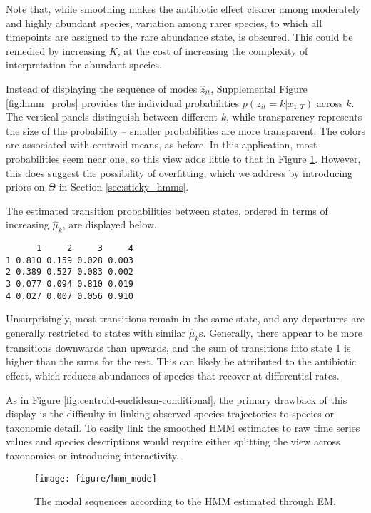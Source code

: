 \documentclass[14pt]{extarticle}
\begin{document}
Note that, while smoothing makes the antibiotic effect clearer among moderately
and highly abundant species, variation among rarer species, to which all
timepoints are assigned to the rare abundance state, is obscured. This could be
remedied by increasing $K$, at the cost of increasing the complexity of
interpretation for abundant species.

Instead of displaying the sequence of modes $\hat{z}_{it}$, Supplemental Figure
\ref{fig:hmm_probs} provides the individual probabilities $p\left(z_{it} = k
\vert x_{1:T}\right)$ across $k$. The vertical panels distinguish between
different $k$, while transparency represents the size of the probability --
smaller probabilities are more transparent. The colors are associated with
centroid means, as before. In this application, most probabilities seem near
one, so this view adds little to that in Figure \ref{fig:hmm_mode}. However,
this does suggest the possibility of overfitting, which we address by
introducing priors on $\Theta$ in Section \ref{sec:sticky_hmms}.

The estimated transition probabilities between states, ordered in terms of
increasing $\hat{\mu}_{k}$, are displayed below.
\begin{verbatim}
      1     2     3     4
1 0.810 0.159 0.028 0.003
2 0.389 0.527 0.083 0.002
3 0.077 0.094 0.810 0.019
4 0.027 0.007 0.056 0.910
\end{verbatim}
Unsurprisingly, most transitions remain in the same state, and any departures
are generally restricted to states with similar $\hat{\mu}_{k}$s. Generally,
there appear to be more transitions downwards than upwards, and the sum of
transitions into state 1 is higher than the sums for the rest. This can likely
be attributed to the antibiotic effect, which reduces abundances of species that
recover at differential rates.

As in Figure \ref{fig:centroid-euclidean-conditional}, the primary drawback of
this display is the difficulty in linking observed species trajectories to
species or taxonomic detail. To easily link the smoothed HMM estimates to raw
time series values and species descriptions would require either splitting the
view across taxonomies or introducing interactivity.

\begin{figure}
  \centering
  \texttt{[image: figure/hmm\_mode]}
  \caption{The modal sequences according to the HMM estimated through
    EM. \label{fig:hmm_mode} }
\end{figure}
\end{document}
